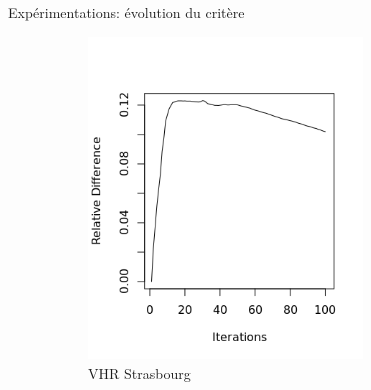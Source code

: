 \documentclass[hyperref={pdfpagelabels=false}]{beamer}
\begin{document}
    \begin{frame}{Expérimentations: évolution du critère}
        \begin{figure}[!h]
            \centering
            \caption{Différences relatives du critère collaboratif avec et sans 
                optimisation des $\beta$ tout au long du processus 
                d'apprentissage.
            }
            \begin{subfigure}[b]{0.32\textwidth}
                \centering
                \includegraphics[width=0.8\textwidth]{vhr_RD}
                \caption{VHR Strasbourg}
            \end{subfigure}
            \begin{subfigure}[b]{0.32\textwidth}
                \centering

\end{subfigure}
\end{figure}
\end{frame}
\end{document}
